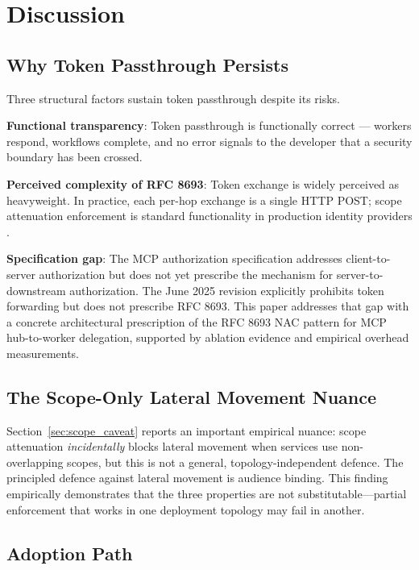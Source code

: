 \documentclass[journal]{IEEEtran}
\theoremstyle{definition}
\begin{document}
\section{Discussion}
\label{sec:discussion}

\subsection{Why Token Passthrough Persists}

Three structural factors sustain token passthrough despite its risks.

\textbf{Functional transparency}: Token passthrough is functionally correct ---
workers respond, workflows complete, and no error signals to the developer that
a security boundary has been crossed.

\textbf{Perceived complexity of RFC 8693}: Token exchange is widely perceived
as heavyweight. In practice, each per-hop exchange is a single HTTP POST;
scope attenuation enforcement is standard functionality in production identity
providers \cite{rfc8693_deploy}.

\textbf{Specification gap}: The MCP authorization specification
\cite{mcp_spec_2025} addresses client-to-server authorization but does not yet
prescribe the mechanism for server-to-downstream authorization. The June 2025
revision explicitly prohibits token forwarding but does not prescribe RFC 8693.
This paper addresses that gap with a concrete architectural prescription of the
RFC 8693 NAC pattern for MCP hub-to-worker delegation, supported by ablation
evidence and empirical overhead measurements.

\subsection{The Scope-Only Lateral Movement Nuance}

Section~\ref{sec:scope_caveat} reports an important empirical nuance: scope
attenuation \textit{incidentally} blocks lateral movement when services use
non-overlapping scopes, but this is not a general, topology-independent defence.
The principled defence against lateral movement is audience binding. This
finding empirically demonstrates that the three properties are not
substitutable---partial enforcement that works in one deployment topology may fail
in another.

\subsection{Adoption Path}
\end{document}
